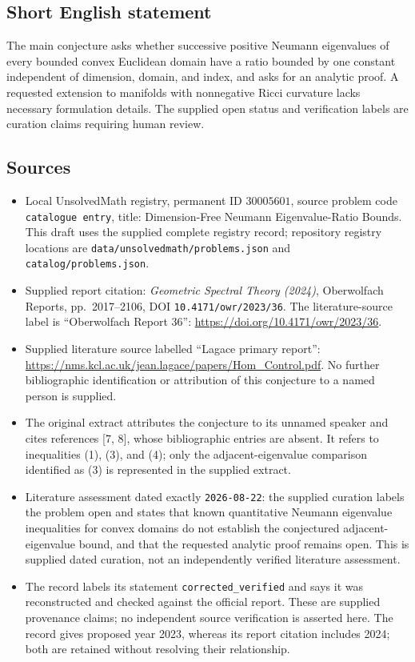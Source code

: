 \documentclass[11pt]{article}
\begin{document}
\subsection{Short English statement}
The main conjecture asks whether successive positive Neumann eigenvalues of every bounded convex Euclidean domain have a ratio bounded by one constant independent of dimension, domain, and index, and asks for an analytic proof. A requested extension to manifolds with nonnegative Ricci curvature lacks necessary formulation details. The supplied open status and verification labels are curation claims requiring human review.
\subsection{Sources}
\begin{itemize}
\item Local UnsolvedMath registry, permanent ID \(30005601\), source problem code \texttt{catalogue entry}, title: Dimension-Free Neumann Eigenvalue-Ratio Bounds. This draft uses the supplied complete registry record; repository registry locations are \texttt{data/unsolvedmath/problems.json} and \texttt{catalog/problems.json}.
\item Supplied report citation: \emph{Geometric Spectral Theory (2024)}, Oberwolfach Reports, pp.\ 2017--2106, DOI \texttt{10.4171/owr/2023/36}. The literature-source label is ``Oberwolfach Report 36'': \url{https://doi.org/10.4171/owr/2023/36}.
\item Supplied literature source labelled ``Lagace primary report'': \url{https://nms.kcl.ac.uk/jean.lagace/papers/Hom_Control.pdf}. No further bibliographic identification or attribution of this conjecture to a named person is supplied.
\item The original extract attributes the conjecture to its unnamed speaker and cites references [7, 8], whose bibliographic entries are absent. It refers to inequalities (1), (3), and (4); only the adjacent-eigenvalue comparison identified as (3) is represented in the supplied extract.
\item Literature assessment dated exactly \texttt{2026-08-22}: the supplied curation labels the problem open and states that known quantitative Neumann eigenvalue inequalities for convex domains do not establish the conjectured adjacent-eigenvalue bound, and that the requested analytic proof remains open. This is supplied dated curation, not an independently verified literature assessment.
\item The record labels its statement \texttt{corrected\_verified} and says it was reconstructed and checked against the official report. These are supplied provenance claims; no independent source verification is asserted here. The record gives proposed year 2023, whereas its report citation includes 2024; both are retained without resolving their relationship.
\end{itemize}
\end{document}

